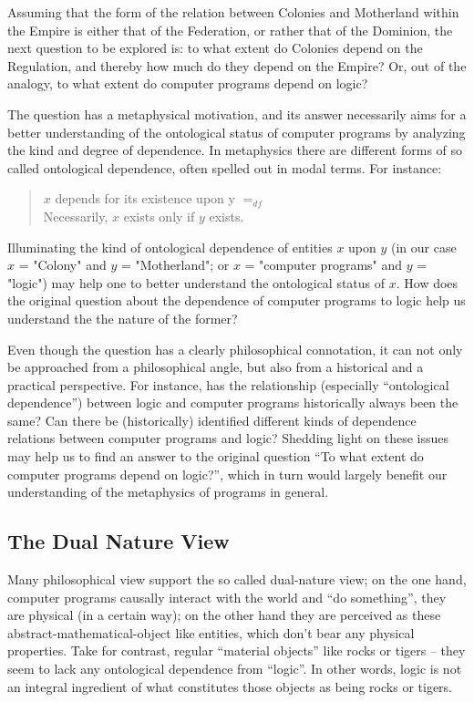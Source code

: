 \documentclass[]{article}
\begin{document}
{\color{red}{this passage is inspired by Nick's note}}

Assuming that the form of the relation between Colonies and Motherland within the Empire is either that of the Federation, or rather that of the Dominion, the next question to be explored is: to what extent do Colonies depend on the Regulation, and thereby how much do they depend on the Empire? Or, out of the analogy, to what extent do computer programs depend on logic?

The question has a metaphysical motivation, and its answer necessarily aims for a better understanding of the ontological status of computer programs by analyzing the kind and degree of dependence. In metaphysics there are different forms of so called ontological dependence, often spelled out in modal terms. For instance:

\begin{quote}
$x$ depends for its existence upon y $=_{df}$\\
Necessarily, $x$ exists only if $y$ exists.
\end{quote}
%
Illuminating the kind of ontological dependence of entities $x$ upon $y$ (in
our case $x$ = "Colony" and $y$ = "Motherland"; or $x$ = "computer programs" and $y$ = "logic") may help one to better understand the ontological status of $x$. How does the original question about the dependence of computer programs to logic help us understand the the nature of the former?

Even though the question has a clearly philosophical connotation, it can
not only be approached from a philosophical angle, but also from a historical
and a practical perspective. For instance, has the relationship (especially
“ontological dependence”) between logic and computer programs historically
always been the same? Can there be (historically) identified different kinds of
dependence relations between computer programs and logic? Shedding light
on these issues may help us to find an answer to the original question “To
what extent do computer programs depend on logic?”, which in turn would
largely benefit our understanding of the metaphysics of programs in general.


\subsection{The Dual Nature View}

Many philosophical view support the so called dual-nature view; on the one hand, computer programs causally interact with the world and “do something”, they are physical (in a certain way); on the other hand they are perceived as these abstract-mathematical-object like entities, which don't bear any physical properties.
Take for contrast, regular “material objects” like rocks or tigers -- they
seem to lack any ontological dependence from “logic”. In other words, logic is
not an integral ingredient of what constitutes those objects as being rocks or
tigers.
\end{document}

